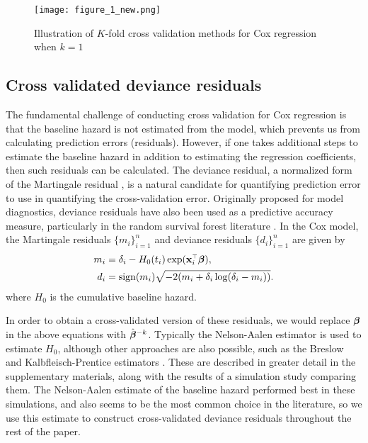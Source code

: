 \begin{figure}
  \centering
  \texttt{[image: figure\_1\_new.png]}
  \caption{\label{Fig:methods} Illustration of $K$-fold cross validation methods for Cox regression when $k = 1$}
\end{figure}	

\subsection{Cross validated deviance residuals}

The fundamental challenge of conducting cross validation for Cox regression is that the baseline hazard is not estimated from the model, which prevents us from calculating prediction errors (residuals).  However, if one takes additional steps to estimate the baseline hazard in addition to estimating the regression coefficients, then such residuals can be calculated.  The deviance residual, a normalized form of the Martingale residual \citep{Therneau1990}, is a natural candidate for quantifying prediction error to use in quantifying the cross-validation error. Originally proposed for model diagnostics, deviance residuals have also been used as a predictive accuracy measure, particularly in the random survival forest literature \citep{LeBlanc1992, Ishwaran2004}. In the Cox model, the Martingale residuals $\{m_i\}_{i=1}^n$ and deviance residuals $\{d_i\}_{i=1}^n$ are given by
\begin{align}
  \label{eq:res-m}
  m_{i} &= \delta_{i} - H_{0}(t_{i})\exp(\mathbf{x}_i^{\scriptscriptstyle\top}\boldsymbol{\beta}), \\
  \label{eq:res-d}
  d_{i} &= \text{sign}(m_{i})\sqrt{-2(m_i + \delta_{i}\log(\delta_{i} - m_i))}.  
\end{align}
where $H_0$ is the cumulative baseline hazard.

In order to obtain a cross-validated version of these residuals, we would replace $\boldsymbol{\beta}$ in the above equations with $\bbh^{-k}$. Typically the Nelson-Aalen estimator is used to estimate $H_0$, although other approaches are also possible, such as the Breslow and Kalbfleisch-Prentice estimators \citep{Breslow1972, Kalbfleisch2011}. These are described in greater detail in the supplementary materials, along with the results of a simulation study comparing them. The Nelson-Aalen estimate of the baseline hazard performed best in these simulations, and also seems to be the most common choice in the literature, so we use this estimate to construct cross-validated deviance residuals throughout the rest of the paper.

